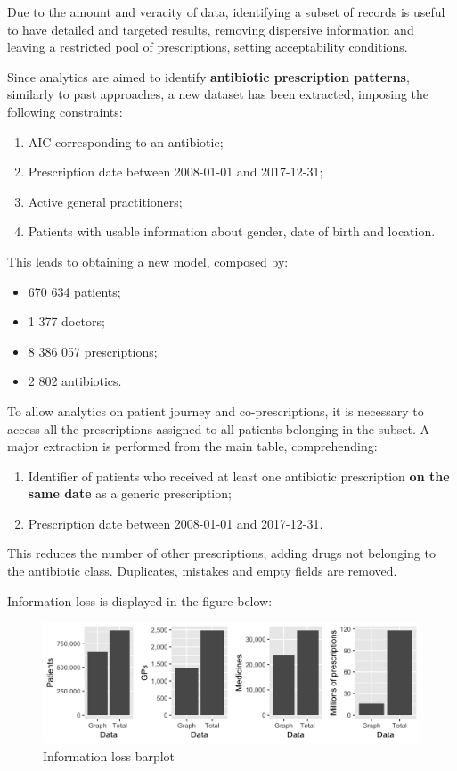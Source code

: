 Due to the amount and veracity of data, identifying a subset of records is useful to have detailed and targeted results, removing dispersive information and leaving a restricted pool of prescriptions, setting acceptability conditions. 

Since analytics are aimed to identify \textbf{antibiotic prescription patterns}, similarly to past approaches, a new dataset has been extracted, imposing the following constraints:
\begin{enumerate}
	\item AIC corresponding to an antibiotic;
	\item Prescription date between 2008-01-01 and 2017-12-31;
	\item Active general practitioners;
	\item Patients with usable information about gender, date of birth and location.
\end{enumerate}

This leads to obtaining a new model, composed by:
\begin{itemize}
	\item 670 634 patients;
	\item 1 377 doctors;
	\item 8 386 057 prescriptions;
	\item 2 802 antibiotics.
\end{itemize}

To allow analytics on patient journey and co-prescriptions, it is necessary to access all the prescriptions assigned to all patients belonging in the subset. A major extraction is performed from the main table, comprehending:
\begin{enumerate}
	\item Identifier of patients who received at least one antibiotic prescription \textbf{on the same date} as a generic prescription;
	\item Prescription date between 2008-01-01 and 2017-12-31.
\end{enumerate}

This reduces the number of other prescriptions, adding drugs not belonging to the antibiotic class. Duplicates, mistakes and empty fields are removed. 

Information loss is displayed in the figure below:
\begin{figure}[h]
	\centering
	\includegraphics[scale=0.33]{../plots/graph-barplots.png}
	\caption{\small Information loss barplot}
\end{figure}

